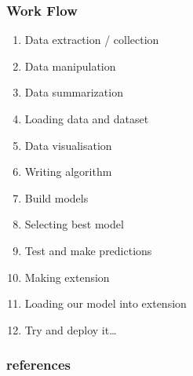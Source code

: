 \documentclass[14pt]{beamer}
\begin{document}
\begin{frame}
    \frametitle{Work Flow}
    \begin{enumerate}
        \item{Data extraction / collection}
        \item{Data manipulation}
        \item{Data summarization}
        \item{Loading data and dataset}
        \item{Data visualisation}
        \item{Writing algorithm}
        \item{Build models}
        \item{Selecting best model}
        \item{Test and make predictions}
        \item{Making extension}
        \item{Loading our model into extension}
        \item{Try and deploy it…}
    \end{enumerate}
\end{frame}

\begin{frame}
    \frametitle{references}
    \href{https://github.com/arvind-rs/phishing_detector}{}
    \href{https://github.com/faizann24/phishytics-machine-learning-for-phishing}{}
    \href{https://machinelearningmastery.com/machine-learning-in-python-step-by-step/}{}
\end{frame}
\end{document}

